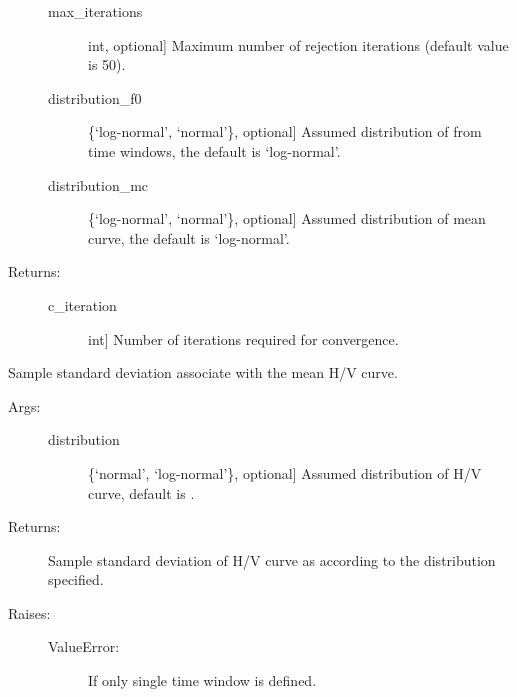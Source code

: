 \documentclass[letterpaper,10pt,english,openany,oneside]{sphinxmanual}
\begin{document}
\begin{fulllineitems}
\begin{fulllineitems}
\begin{description}
\begin{description}
\item[{max\_iterations}] \leavevmode{[}int, optional{]}
Maximum number of rejection iterations (default value is
50).

\item[{distribution\_f0}] \leavevmode{[}\{‘log-normal’, ‘normal’\}, optional{]}
Assumed distribution of  from time windows, the
default is ‘log-normal’.

\item[{distribution\_mc}] \leavevmode{[}\{‘log-normal’, ‘normal’\}, optional{]}
Assumed distribution of mean curve, the default is
‘log-normal’.

\end{description}

\item[{Returns:}] \leavevmode\begin{description}
\item[{c\_iteration}] \leavevmode{[}int{]}
Number of iterations required for convergence.

\end{description}

\end{description}

\end{fulllineitems}


\begin{fulllineitems}
\label{\detokenize{index:hvsrpy.Hvsr.std_curve}}
Sample standard deviation associate with the mean H/V curve.
\begin{description}
\item[{Args:}] \leavevmode\begin{description}
\item[{distribution}] \leavevmode{[}\{‘normal’, ‘log-normal’\}, optional{]}
Assumed distribution of H/V curve, default is
.

\end{description}

\item[{Returns:}] \leavevmode
Sample standard deviation of H/V curve as 
according to the distribution specified.

\item[{Raises:}] \leavevmode\begin{description}
\item[{ValueError:}] \leavevmode
If only single time window is defined.


\end{description}
\end{description}
\end{fulllineitems}
\end{fulllineitems}
\end{document}
